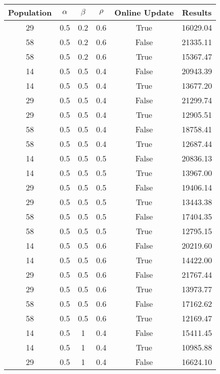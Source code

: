 \documentclass[12pt]{article}
\begin{document}
\begin{table}[h!]
\centering
\begin{tabular}{|c|c|c|c|c|c|}
\hline
\textbf{Population} & $\alpha$ & $\beta$ & $\rho$ & \textbf{Online Update} & \textbf{Results} \\ \hline
29  &  0.5  &  0.2  &  0.6  &  True  &  16029.04\\ \hline
58  &  0.5  &  0.2  &  0.6  &  False  &  21335.11\\ \hline
58  &  0.5  &  0.2  &  0.6  &  True  &  15367.47\\ \hline
14  &  0.5  &  0.5  &  0.4  &  False  &  20943.39\\ \hline
14  &  0.5  &  0.5  &  0.4  &  True  &  13677.20\\ \hline
29  &  0.5  &  0.5  &  0.4  &  False  &  21299.74\\ \hline
29  &  0.5  &  0.5  &  0.4  &  True  &  12905.51\\ \hline
58  &  0.5  &  0.5  &  0.4  &  False  &  18758.41\\ \hline
58  &  0.5  &  0.5  &  0.4  &  True  &  12687.44\\ \hline
14  &  0.5  &  0.5  &  0.5  &  False  &  20836.13\\ \hline
14  &  0.5  &  0.5  &  0.5  &  True  &  13967.00\\ \hline
29  &  0.5  &  0.5  &  0.5  &  False  &  19406.14\\ \hline
29  &  0.5  &  0.5  &  0.5  &  True  &  13443.38\\ \hline
58  &  0.5  &  0.5  &  0.5  &  False  &  17404.35\\ \hline
58  &  0.5  &  0.5  &  0.5  &  True  &  12795.15\\ \hline
14  &  0.5  &  0.5  &  0.6  &  False  &  20219.60\\ \hline
14  &  0.5  &  0.5  &  0.6  &  True  &  14422.00\\ \hline
29  &  0.5  &  0.5  &  0.6  &  False  &  21767.44\\ \hline
29  &  0.5  &  0.5  &  0.6  &  True  &  13973.77\\ \hline
58  &  0.5  &  0.5  &  0.6  &  False  &  17162.62\\ \hline
58  &  0.5  &  0.5  &  0.6  &  True  &  12169.47\\ \hline
14  &  0.5  &  1  &  0.4  &  False  &  15411.45\\ \hline
14  &  0.5  &  1  &  0.4  &  True  &  10985.88\\ \hline
29  &  0.5  &  1  &  0.4  &  False  &  16624.10\\ \hline

\end{tabular}
\end{table}
\end{document}

